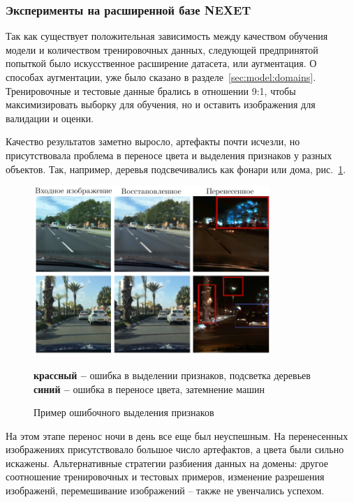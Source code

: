 \documentclass[11pt,a4paper]{extarticle}
\begin{document}
{			\subsubsection*{Эксперименты на расширенной базе NEXET}\label{sec:tests:nexet_ext}
				
				Так как существует положительная зависимость между качеством обучения модели и количеством тренировочных данных, следующей предпринятой попыткой было искусственное расширение датасета, или аугментация.
				О способах аугментации, уже было сказано в разделе~\ref{sec:model:domains}.
				Тренировочные и тестовые данные брались в отношении 9:1, чтобы максимизировать выборку для обучения, но и оставить изображения для валидации и оценки.
				
				Качество результатов заметно выросло, артефакты почти исчезли, но присутствовала проблема в переносе цвета и выделения признаков у разных объектов.
				Так, например, деревья подсвечивались как фонари или дома, рис.~\ref{pic:nexet_ext}.

				\begin{figure}[ht]
					\centering
					\includegraphics[width=0.8\textwidth]{img/nexet_ext}
					\caption{Пример ошибочного выделения признаков}{
						\small{
							{\color[HTML]{CB0000} \textbf{крассный --}} ошибка в выделении признаков, подсветка деревьев \\
							{\color[HTML]{3b4daf} \textbf{синий --}} ошибка в переносе цвета, затемнение машин
						}
					}
					\label{pic:nexet_ext}
				\end{figure}
				
				\noindent
				На этом этапе перенос ночи в день все еще был неуспешным. На перенесенных изображениях присутствовало большое число артефактов, а цвета были сильно искажены.
				Альтернативные стратегии разбиения данных на домены: другое соотношение тренировочных и тестовых примеров, изменение разрешения изображенй, перемешивание изображений -- также не увенчались успехом.
				
}
\end{document}
